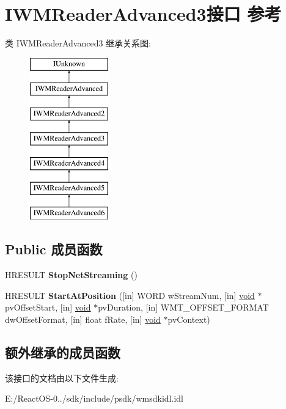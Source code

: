 \hypertarget{interface_i_w_m_reader_advanced3}{}\section{I\+W\+M\+Reader\+Advanced3接口 参考}
\label{interface_i_w_m_reader_advanced3}
类 I\+W\+M\+Reader\+Advanced3 继承关系图\+:\begin{figure}[H]
\begin{center}
\leavevmode
\includegraphics[height=7.000000cm]{interface_i_w_m_reader_advanced3}
\end{center}
\end{figure}
\subsection*{Public 成员函数}
\begin{DoxyCompactItemize}
\item 
\mbox{\label{interface_i_w_m_reader_advanced3_a5c70fc9cb10a5a1ec3e391c2829782a5}} 
H\+R\+E\+S\+U\+LT {\bfseries Stop\+Net\+Streaming} ()
\item 
\mbox{\label{interface_i_w_m_reader_advanced3_a22dd429d37fa8d24b65f80e46b5f5e96}} 
H\+R\+E\+S\+U\+LT {\bfseries Start\+At\+Position} (\mbox{[}in\mbox{]} W\+O\+RD w\+Stream\+Num, \mbox{[}in\mbox{]} \hyperlink{interfacevoid}{void} $\ast$pv\+Offset\+Start, \mbox{[}in\mbox{]} \hyperlink{interfacevoid}{void} $\ast$pv\+Duration, \mbox{[}in\mbox{]} W\+M\+T\+\_\+\+O\+F\+F\+S\+E\+T\+\_\+\+F\+O\+R\+M\+AT dw\+Offset\+Format, \mbox{[}in\mbox{]} float f\+Rate, \mbox{[}in\mbox{]} \hyperlink{interfacevoid}{void} $\ast$pv\+Context)
\end{DoxyCompactItemize}
\subsection*{额外继承的成员函数}


该接口的文档由以下文件生成\+:\begin{DoxyCompactItemize}
\item 
E\+:/\+React\+O\+S-\/0../sdk/include/psdk/wmsdkidl.\+idl\end{DoxyCompactItemize}
